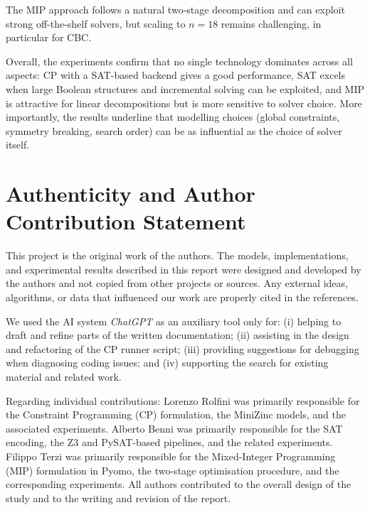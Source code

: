 \documentclass{article}
\begin{document}
The MIP approach follows a natural two-stage decomposition and
can exploit strong off-the-shelf solvers, but scaling to $n=18$ remains
challenging, in particular for CBC.

Overall, the experiments confirm that no single technology dominates across
all aspects: CP with a SAT-based backend gives a good performance, SAT excels 
when large Boolean structures and
incremental solving can be exploited, and MIP is attractive for linear
decompositions but is more sensitive to solver choice. More importantly, the
results underline that modelling choices (global constraints, symmetry
breaking, search order) can be as influential as the choice of solver itself.


\section{Authenticity and Author Contribution Statement}

This project is the original work of the authors. The models, implementations,
and experimental results described in this report were designed and developed
by the authors and not copied from other projects or sources. Any external
ideas, algorithms, or data that influenced our work are properly cited in the
references.

We used the AI system \emph{ChatGPT} as an auxiliary tool only for:
(i) helping to draft and refine parts of the written documentation;
(ii) assisting in the design and refactoring of the CP runner script;
(iii) providing suggestions for debugging when diagnosing coding issues; and
(iv) supporting the search for existing material and related work.

Regarding individual contributions:
Lorenzo Rolfini was primarily responsible for the Constraint Programming (CP)
formulation, the MiniZinc models, and the associated experiments.
Alberto Benni was primarily responsible for the SAT encoding, the Z3 and
PySAT-based pipelines, and the related experiments.
Filippo Terzi was primarily responsible for the Mixed-Integer Programming
(MIP) formulation in Pyomo, the two-stage optimisation procedure, and the
corresponding experiments.
All authors contributed to the overall design of the study and to the writing
and revision of the report.


\nocite{*}
\printbibliography
\end{document}

